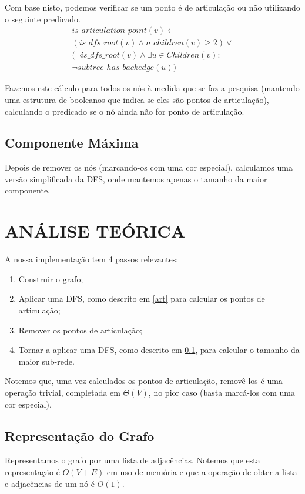 \documentclass[a4paper, 12pt, conference, portuguese]{ieeeconf}
\begin{document}
Com base nisto, podemos verificar se um ponto é de articulação ou não utilizando
o seguinte predicado.
\begin{align*}\label{predicate}
  is\_articulation\_point(v) \leftarrow \\ (is\_dfs\_root(v) \land n\_children(v) \geq
  2) \lor \\ (\lnot is\_dfs\_root(v) \land  \exists u \in Children(v) : \\ \lnot subtree\_has\_backedge(u))
\end{align*}

Fazemos este cálculo para todos os nós à medida que se faz a pesquisa (mantendo uma
estrutura de booleanos que indica se eles são pontos de articulação), calculando o
predicado se o nó ainda não for ponto de articulação.

\subsection{Componente Máxima}\label{dfs}
Depois de remover os nós (marcando-os com uma cor especial), calculamos uma
versão simplificada da DFS, onde mantemos apenas o tamanho da maior componente.

\section{ANÁLISE TEÓRICA}\label{theoric}

A nossa implementação tem 4 passos relevantes:
\begin{enumerate}
  \item
    Construir o grafo;
  \item
    Aplicar uma DFS, como descrito em \ref{art} para calcular os pontos de
    articulação;
  \item
    Remover os pontos de articulação;
  \item
    Tornar a aplicar uma DFS, como descrito em \ref{dfs}, para calcular o
    tamanho da maior sub-rede.
\end{enumerate}

Notemos que, uma vez calculados os pontos de articulação, removê-los é uma
operação trivial, completada em $\Theta(V)$, no pior caso (basta marcá-los com uma
cor especial).

\subsection{Representação do Grafo}
Representamos o grafo por uma lista de adjacências. Notemos que esta
representação é $O(V + E)$ \cite{cormen} em uso de memória e que a operação de obter a lista
e adjacências de um nó é $O(1)$.
\end{document}
